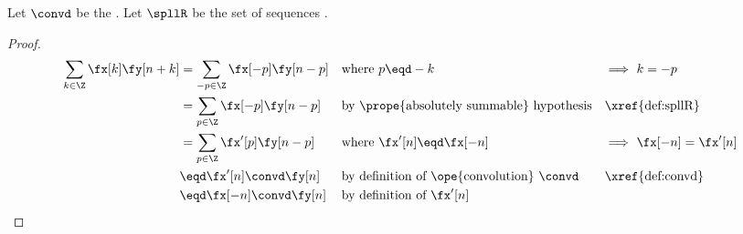 \begin{proposition}
\label{prop:conv_knk}
Let $\convd$ be the  .
Let $\spllR$ be the set of  sequences .
\end{proposition}
\begin{proof}
\begin{align*}
  \sum_{k\in\Z} \fx[k]\fy[n+k]
    &= \sum_{-p\in\Z} \fx[-p]\fy[n-p]
    && \text{where $p\eqd -k$}
    && \text{$\implies$ $k=-p$}
  \\&= \sum_{p\in\Z} \fx[-p]\fy[n-p]
    && \text{by \prope{absolutely summable} hypothesis}
    && \text{\xref{def:spllR}}
  \\&= \sum_{p\in\Z} \fx'[p]\fy[n-p]
    && \text{where $\fx'[n] \eqd\fx[-n]$}
    && \text{$\implies$ $\fx[-n]=\fx'[n]$}
  \\&\eqd \fx'[n]\convd\fy[n]
    && \text{by definition of \ope{convolution} $\convd$}
    && \text{\xref{def:convd}}
  \\&\eqd \fx[-n]\convd\fy[n]
    && \text{by definition of $\fx'[n]$}
\end{align*}
\end{proof}
